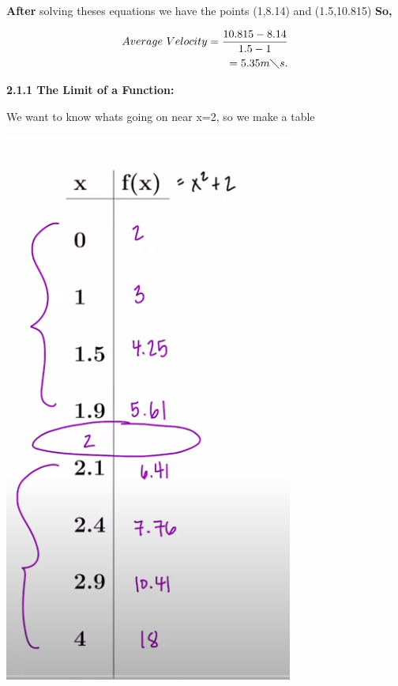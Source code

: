 \documentclass{report}
\begin{document}
    \bigbreak \noindent 
    \textbf{After} solving theses equations we have the points (1,8.14) and (1.5,10.815)
    \bigbreak \noindent 
    \textbf{So,}
    
    \begin{align*}
        Average\ Velocity = \frac{10.815-8.14}{1.5-1} \\
        = 5.35 m \diagdown s
    .\end{align*}


    \pagebreak
    \begin{Large}
        \textbf{2.1.1 The Limit of a Function:}
    \end{Large}
    
   \bigbreak \noindent \bigbreak \noindent  

    \bigbreak \noindent 
    We want to know whats going on near x=2, so we make a table

    \bigbreak \noindent 
    \begin{center}
        \includegraphics[scale=0.5]{../images/tbale.png}
    \end{center}
\end{document}
